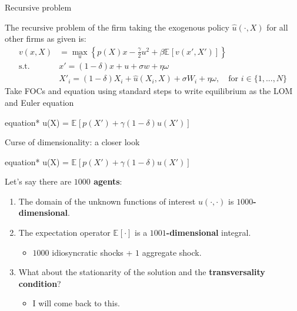 \documentclass[aspectratio=169,10pt]{beamer}
\newcommand{\emphcolor}[1]{\textbf{\textcolor{emphcolorval}{#1}}}
\newcommand{\expec}[2][]{\ensuremath{\mathbb{E}_{{#1}}\left[ {#2} \right]}}
\begin{document}
	\begin{frame}{Recursive problem}
	
	
	The recursive problem of the firm taking the exogenous policy $\hat{u}(\cdot, X)$ for all other firms as given is:
	\begin{align*}
		v(x,X)       & =\max_{u}\left\{p(X)x -  \frac{\gamma}{2} u^2 + \beta \expec{v(x',X')}\right\}                      \\
		\text{s.t. } & x' = (1-\delta)x + u + \sigma w + \eta \omega                                                       \\
		& X'_i = (1-\delta)X_i + \hat{u}(X_i,X) + \sigma W_i + \eta \omega,\quad\text{for } i \in \{1,...,N\}\end{align*}
	Take FOCs and equation using standard steps to write equilibrium as the LOM and Euler equation
	\begin{empheq}[box=\tcbhighmath]{equation*}
		\gamma u(X) = \beta \expec{p(X')+\gamma (1-\delta) u(X') }
	\end{empheq}
	

\end{frame}


\begin{frame}{Curse of dimensionality: a closer look }
	\begin{empheq}[box=\tcbhighmath]{equation*}
		\gamma u(X) = \beta \expec{p(X')+\gamma (1-\delta) u(X') }
	\end{empheq}
Let's say there are \emphcolor{$1000$ agents}:
\begin{enumerate}
	\item The domain of the unknown functions of interest $u(\cdot,\cdot)$ is \emphcolor{$1000$-dimensional}.\vspace{0.1in}
	\item The expectation operator $\expec{\cdot}$  is a \emphcolor{$1001$-dimensional} integral.\vspace{0.1in}
	\begin{itemize}
		\item $1000$ idiosyncratic shocks + $1$ aggregate shock.\vspace{0.1in}
	\end{itemize}
	\item What about the stationarity of the solution and the \emphcolor{transversality condition}?\vspace{0.1in}
	\begin{itemize}
		\item I will come back to this.
	\end{itemize}
\end{enumerate}
	
\end{frame}
	
\end{document}

